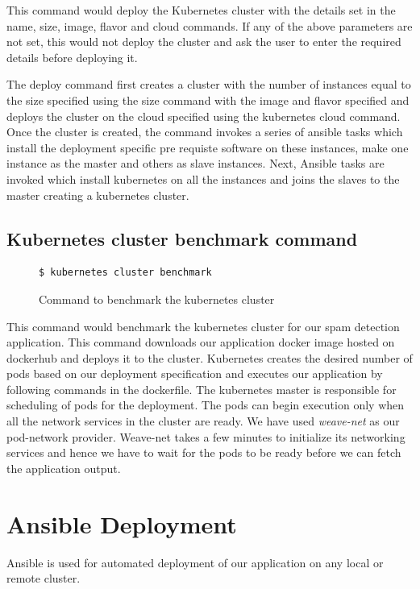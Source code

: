 \documentclass[9pt,twocolumn,twoside]{../../styles/osajnl}
\begin{document}
{This command would deploy the Kubernetes cluster with the details set
in the name, size, image, flavor and cloud commands. If any of the
above parameters are not set, this would not deploy the cluster and
ask the user to enter the required details before deploying it.

\noindent
The deploy command first creates a cluster with the number of
instances equal to the size specified using the size command with the
image and flavor specified and deploys the cluster on the cloud
specified using the kubernetes cloud command. Once the cluster is
created, the command invokes a series of ansible tasks which install
the deployment specific pre requiste software on these instances, make
one instance as the master and others as slave instances. Next,
Ansible tasks are invoked which install kubernetes on all the
instances and joins the slaves to the master creating a kubernetes
cluster.

\subsection{Kubernetes cluster benchmark command}
\begin{figure}[H]
\begin{verbatim}
$ kubernetes cluster benchmark
\end{verbatim}
\caption{Command to benchmark the kubernetes cluster}
\vspace{-4mm}
\label{Command to benchmark the kubernetes cluster}
\end{figure}

This command would benchmark the kubernetes cluster for our spam
detection application. This command downloads our application docker
image hosted on dockerhub and deploys it to the cluster. Kubernetes
creates the desired number of pods based on our deployment
specification and executes our application by following commands in
the dockerfile. The kubernetes master is responsible for scheduling of
pods for the deployment. The pods can begin execution only when all
the network services in the cluster are ready. We have used
\emph{weave-net} as our pod-network provider. Weave-net takes a few
minutes to initialize its networking services and hence we have to
wait for the pods to be ready before we can fetch the application
output.

\section{Ansible Deployment}
Ansible is used for automated deployment of our application on any
local or remote cluster.

}
\end{document}
